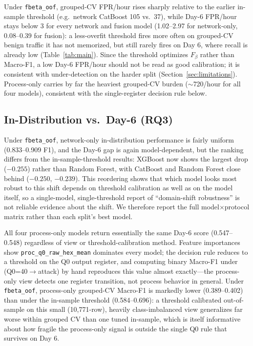 \documentclass[conference]{IEEEtran}
\newcommand{\fbetaoof}{\texttt{fbeta\_oof}}
\begin{document}
Under \fbetaoof, grouped-CV FPR/hour rises sharply relative to the earlier in-sample threshold (e.g.\
network CatBoost 105 vs.\ 37), while Day-6 FPR/hour stays below 3 for every network and fusion model
(1.02--2.97 for network-only, 0.08--0.39 for fusion): a less-overfit threshold fires more often on
grouped-CV benign traffic it has not memorized, but still rarely fires on Day 6, where recall is already
low (Table~\ref{tab:main}). Since the threshold optimizes $F_\beta$ rather than Macro-F1, a low Day-6
FPR/hour should not be read as good calibration; it is consistent with under-detection on the harder
split (Section~\ref{sec:limitations}). Process-only carries by far the heaviest grouped-CV burden
($\sim$720/hour for all four models), consistent with the single-register decision rule below.

\subsection{In-Distribution vs.\ Day-6 (RQ3)}

Under \fbetaoof, network-only in-distribution performance is fairly uniform (0.833--0.909 F1), and the
Day-6 gap is again model-dependent, but the ranking differs from the in-sample-threshold results: XGBoost
now shows the largest drop ($-0.255$) rather than Random Forest, with CatBoost and Random Forest close
behind ($-0.250$, $-0.239$). This reordering shows that which model looks most robust to this shift
depends on threshold calibration as well as on the model itself, so a single-model, single-threshold
report of ``domain-shift robustness'' is not reliable evidence about the shift. We therefore report the
full model$\times$protocol matrix rather than each split's best model.

All four process-only models return essentially the same Day-6 score (0.547--0.548) regardless of view or
threshold-calibration method. Feature importances show \texttt{proc\_q0\_raw\_hex\_mean} dominates every
model; the decision rule reduces to a threshold on the Q0 output register, and computing binary Macro-F1
under (Q0=40$\rightarrow$attack) by hand reproduces this value almost exactly---the process-only view
detects one register transition, not process behavior in general. Under \fbetaoof, process-only
grouped-CV Macro-F1 is markedly lower (0.389--0.402) than under the in-sample threshold (0.584--0.696): a
threshold calibrated out-of-sample on this small (10{,}771-row), heavily class-imbalanced view generalizes
far worse within grouped CV than one tuned in-sample, which is itself informative about how fragile the
process-only signal is outside the single Q0 rule that survives on Day 6.
\end{document}
